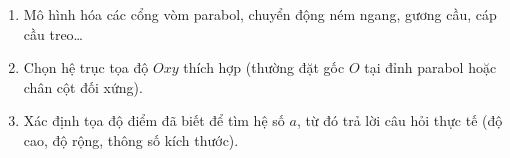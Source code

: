 \begin{enumerate}
\item Mô hình hóa các cổng vòm parabol, chuyển động ném ngang, gương cầu, cáp cầu treo\dots
\item Chọn hệ trục tọa độ $Oxy$ thích hợp (thường đặt gốc $O$ tại đỉnh parabol hoặc chân cột đối xứng).
\item Xác định tọa độ điểm đã biết để tìm hệ số $a$, từ đó trả lời câu hỏi thực tế (độ cao, độ rộng, thông số kích thước).
\end{enumerate}
